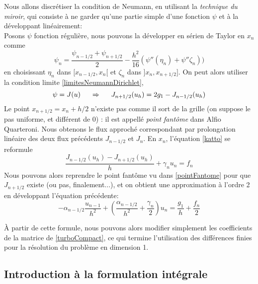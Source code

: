 \documentclass[12pt]{article}
\newcommand{\espace}{\hspace{5mm}}
\begin{document}
Nous allons discrétiser la condition de Neumann, en utilisant la \emph{technique du miroir}, qui consiste à ne garder qu'une partie simple d'une fonction $\psi$ et à la développant linéairement:
\\Posons $\psi$ fonction régulière, nous pouvons la développer en sérien de Taylor en $x_n$ comme 
\begin{equation}
\psi_n = \frac{\psi_{n-1/2} + \psi_{n+1/2}}{2} - \frac{h^2}{16}(\psi '' (\eta_n) + \psi '' \zeta_n))
\end{equation}
en choisissant $\eta_n$ dans $[x_{n-1/2}, x_n[$ et $\zeta_n$ dans $]x_n, x_{n+1/2}].$ On peut alors utiliser la condition limite \eqref{limitesNeumannDirichlet},
\begin{equation} \label{pointFantome}
\psi = J(u) \espace \Rightarrow \espace J_{n+1/2}(u_h) = 2g_1 - J_{n-1/2}(u_h)
\end{equation}
Le point $x_{n+1/2} = x_n + h/2$ n'existe pas comme il sort de la grille (on suppose le pas uniforme, et différent de 0) : il est appellé \emph{point fantôme} dans Alfio Quarteroni.  Nous obtenons le flux approché correspondant par prolongation linéaire des deux flux précédents $J_{n-1/2}$ et $J_n$. En $x_n$, l'équation \eqref{katto} se reformule
\begin{equation}
\frac{J_{n-1/2}(u_h) - J_{n+1/2}(u_h)}{h} + \gamma_n u_n = f_n
\end{equation}
Nous pouvons alors reprendre le point fantôme vu dans \eqref{pointFantome} pour que $J_{n+1/2}$ existe (ou pas, finalement...), et on obtient une approximation à l'ordre 2 en développant l'équation précédente:
\begin{equation}
- \alpha_{n-1/2} \frac{u_{n-1}}{h^2} + (\frac{\alpha_{n-1/2}}{h^2} + \frac{\gamma_n}{2} ) u_n = \frac{g_1}{h} + \frac{f_n}{2}
\end{equation}

À partir de cette formule, nous pouvons alors modifier simplement les coefficients de la matrice de \eqref{turboCompact}, ce qui termine l'utilisation des différences finies pour la résolution du problème en dimension 1.


\subsection{Introduction à la formulation intégrale}
\end{document}
